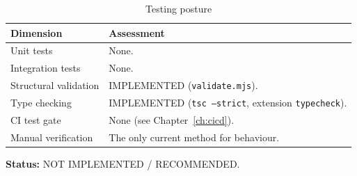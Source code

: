 \begin{table}[H]
\centering
\caption{Testing posture}
\begin{tabular}{@{}L{4.4cm}L{9.8cm}@{}}
\toprule
\textbf{Dimension} & \textbf{Assessment} \\
\midrule
Unit tests & None. \\
Integration tests & None. \\
Structural validation & IMPLEMENTED (\texttt{validate.mjs}). \\
Type checking & IMPLEMENTED (\texttt{tsc --strict}, extension \texttt{typecheck}). \\
CI test gate & None (see Chapter~\ref{ch:cicd}). \\
Manual verification & The only current method for behaviour. \\
\bottomrule
\end{tabular}
\end{table}

\textbf{Status:} NOT IMPLEMENTED / RECOMMENDED.
